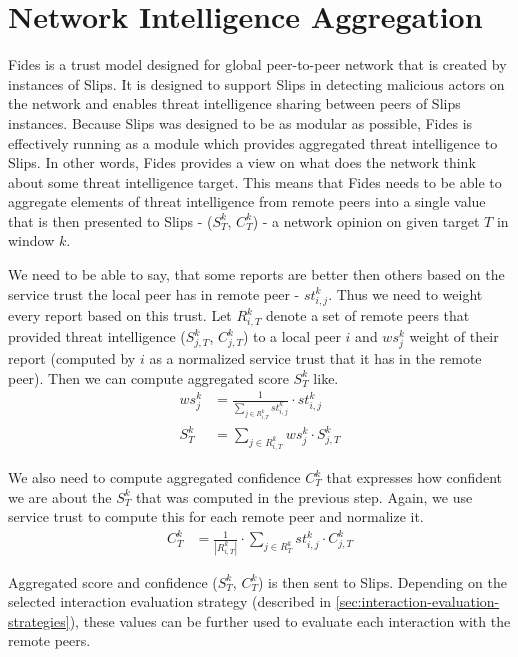 \section{Network Intelligence Aggregation}
\label{sec:network-intelligence-aggregation}
Fides is a trust model designed for global peer-to-peer network that is created by instances of Slips.
It is designed to support Slips in detecting malicious actors on the network and enables threat intelligence sharing between peers of Slips instances.
Because Slips was designed to be as modular as possible, Fides is effectively running as a module which provides aggregated threat intelligence to Slips. 
In other words, Fides provides a view on what does the network think about some threat intelligence target.
This means that Fides needs to be able to aggregate elements of threat intelligence from remote peers into a single value that is then presented to Slips - ($S^{k}_{T}$, $C^{k}_{T}$) - a network opinion on given target $T$ in window $k$.

We need to be able to say, that some reports are better then others based on the service trust the local peer has in remote peer - $st^{k}_{i, j}$.
Thus we need to weight every report based on this trust.
Let $R^{k}_{i, T}$ denote a set of remote peers that provided threat intelligence ($S^{k}_{j, T}$, $C^{k}_{j, T}$) to a local peer $i$ and $ws^{k}_{j}$ weight of their report (computed by $i$ as a normalized service trust that it has in the remote peer).
Then we can compute aggregated score $S^{k}_{T}$ like.
\begin{equation}
\begin{split}
    ws^{k}_{j} &= \frac{1}{\sum_{{j}\in R^{k}_{i, T}} st^{k}_{i, j}} \cdot st^{k}_{i, j} \\
    S^{k}_{T} &= \sum_{{j}\in R^{k}_{i, T}} ws^{k}_{j} \cdot S^{k}_{j, T}
\end{split}
\end{equation}

We also need to compute aggregated confidence $C^{k}_{T}$ that expresses how confident we are about the $S^{k}_{T}$ that was computed in the previous step.
Again, we use service trust to compute this for each remote peer and normalize it. 
\begin{equation}
\begin{split}
    C^{k}_{T} &= \frac{1}{|R^{k}_{i, T}|} \cdot \sum_{{j}\in R^{k}_{T}} st^{k}_{i, j} \cdot C^{k}_{j, T}
\end{split}
\end{equation}

\noindent 
Aggregated score and confidence ($S^{k}_{T}$, $C^{k}_{T}$) is then sent to Slips.
Depending on the selected interaction evaluation strategy (described in \ref{sec:interaction-evaluation-strategies}), these values can be further used to evaluate each interaction with the remote peers.
